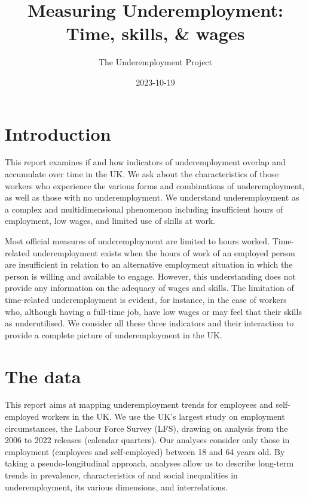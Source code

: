 \documentclass[
]{book}
\title{Measuring Underemployment: Time, skills, \& wages}
\author{The Underemployment Project}
\date{2023-10-19}
\begin{document}
\maketitle

{
\hypersetup{linkcolor=}
\setcounter{tocdepth}{2}
\tableofcontents
}
\hypertarget{introduction}{%
\chapter*{Introduction}\label{introduction}}


This report examines if and how indicators of underemployment overlap and accumulate over time in the UK. We ask about the characteristics of those workers who experience the various forms and combinations of underemployment, as well as those with no underemployment. We understand underemployment as a complex and multidimensional phenomenon including insufficient hours of employment, low wages, and limited use of skills at work.

Most official measures of underemployment are limited to hours worked. Time-related underemployment exists when the hours of work of an employed person are insufficient in relation to an alternative employment situation in which the person is willing and available to engage. However, this understanding does not provide any information on the adequacy of wages and skills. The limitation of time-related underemployment is evident, for instance, in the case of workers who, although having a full-time job, have low wages or may feel that their skills as underutilised. We consider all these three indicators and their interaction to provide a complete picture of underemployment in the UK.

\hypertarget{the-data}{%
\chapter*{The data}\label{the-data}}


This report aims at mapping underemployment trends for employees and self-employed workers in the UK. We use the UK's largest study on employment circumstances, the Labour Force Survey (LFS), drawing on analysis from the 2006 to 2022 releases (calendar quarters). Our analyses consider only those in employment (employees and self-employed) between 18 and 64 years old. By taking a pseudo-longitudinal approach, analyses allow us to describe long-term trends in prevalence, characteristics of and social inequalities in underemployment, its various dimensions, and interrelations.
\end{document}
